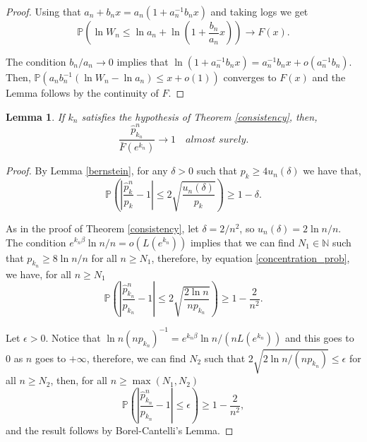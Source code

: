 \documentclass[sn-mathphys-ay]{sn-jnl}%
\newtheorem{lemma}{Lemma}[section]
\newcommand{\N}{\mathbb{N}}
\renewcommand{\P}{\mathbb{P}}
\begin{document}
\begin{appendices}
\begin{proof}
    Using that \({a_n} + {b_n}x = {a_n}\left( {1 + a_n^{-1}b_nx} \right)\) and taking
    logs we get
    \begin{equation*}
        \P\left( {\ln {W_n} \leqslant \ln {a_n} + \ln \left( {1 + \frac{{{b_n}}}{{{a_n}}}x} \right)} \right) \to F\left( x \right).
    \end{equation*}

    The condition \({b_n}/{a_n}\to 0\) implies that $\ln \left( {1 + a_n^{-1}b_nx}
        \right) = a_n^{-1}b_nx + o\left( a_n^{-1}b_n \right)$. Then, $\P\left(
        {{a_nb_n^{-1}}(\ln {W_n} - \ln {a_n}) \leqslant x + o\left( 1 \right)} \right)$
    converges to $F\left( x \right)$ and the Lemma follows by the continuity of
    \(F\).
\end{proof}

\begin{lemma}\label{convergence_probability_p_k}
    If \(k_n\) satisfies the hypothesis of Theorem \ref{consistency}, then,
    \[\frac{{\widehat p_{{k_n}}^n}}{{\bar F\left( {{e^{{k_n}}}} \right)}}\to 1\quad \textit{almost surely}.\]
\end{lemma}

\begin{proof}
    By Lemma \ref{bernstein}, for any \(\delta>0\) such that \(p_k\geq 4
    u_n\left(\delta\right)\) we have that,
    \begin{equation}\label{concentration_prob}
        \P\left( {\left| {\frac{{\widehat p_k^n}}{{{p_k}}} - 1} \right| \leqslant 2\sqrt {\frac{{{u_n}\left( \delta  \right)}}{{{p_k}}}} } \right) \geqslant 1 - \delta.
    \end{equation}

    As in the proof of Theorem \ref{consistency}, let \(\delta = {2}/{n^2}\), so
    \(u_n(\delta)={2\ln{n}}/{n}\). The condition \(e^{k_n\beta}{\ln{n}}/{n}=o\left(
    {L\left( {{e^{{k_n}}}} \right)} \right)\) implies that we can find \(N_1\in\N\)
    such that \({p_{{k_n}}} \geqslant {{8\ln n}}/{n}\) for all \(n\geq N_1\),
    therefore, by equation \eqref{concentration_prob}, we have, for all $n \geqslant
        {N_1}$
    \begin{equation*}
        \P\left( {\left| {\frac{{\widehat p_{{k_n}}^n}}{{{p_{{k_n}}}}} - 1} \right| \leqslant 2\sqrt {\frac{{2\ln n}}{{n{p_{{k_n}}}}}} } \right) \geqslant 1 - \frac{2}{{{n^2}}}.
    \end{equation*}

    Let \(\epsilon>0\). Notice that \({{\ln n}}{{(n{p_{{k_n}}})^{-1}}} =
    {{{e^{{k_n}\beta }}\ln n }}/{(nL\left( {{e^{{k_n}}}} \right))}\) and this goes to
    0 as $n$ goes to \(+\infty\), therefore, we can find \(N_2\) such that \(2\sqrt
    {{{2\ln n}}/{{(n{p_{{k_n}}})}}} \leqslant \epsilon\) for all \(n\geq N_2\), then,
    for all $n \geqslant \max \left( {{N_1},{N_2}} \right)$
    \begin{equation*}
        \P\left( {\left| {\frac{{\widehat p_{{k_n}}^n}}{{{p_{{k_n}}}}} - 1} \right| \leqslant \epsilon } \right) \geqslant 1 - \frac{2}{{{n^2}}},
    \end{equation*}
    and the result follows by Borel-Cantelli's Lemma.
\end{proof}


\end{appendices}
\end{document}
